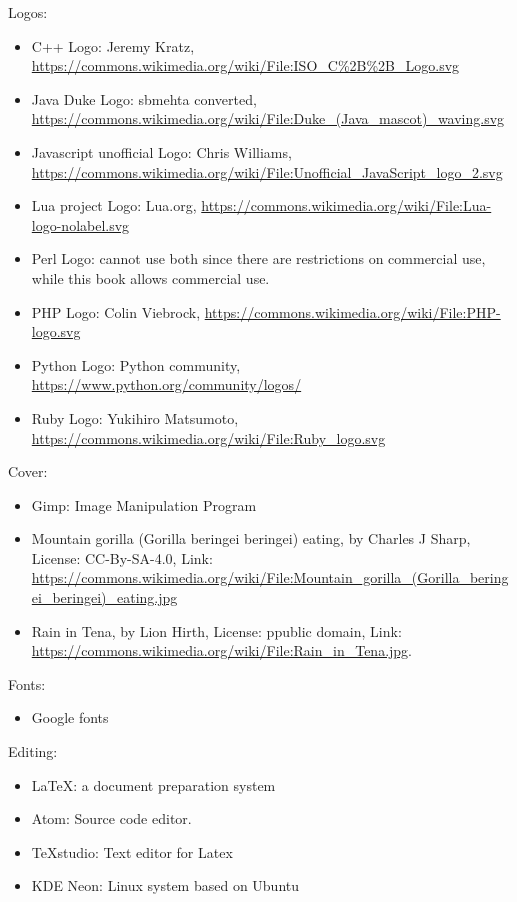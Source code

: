 \documentclass[12pt]{book}
\begin{document}
Logos: 
\begin{itemize}
	\item C++ Logo: Jeremy Kratz, \url{https://commons.wikimedia.org/wiki/File:ISO_C\%2B\%2B_Logo.svg}
	\item Java Duke Logo: sbmehta converted, \url{https://commons.wikimedia.org/wiki/File:Duke_(Java_mascot)_waving.svg}
	\item Javascript unofficial Logo: Chris Williams,  \url{https://commons.wikimedia.org/wiki/File:Unofficial_JavaScript_logo_2.svg}
	\item Lua project Logo: Lua.org, \url{https://commons.wikimedia.org/wiki/File:Lua-logo-nolabel.svg}
	\item Perl Logo: cannot use both since there are restrictions on commercial use, while this book allows commercial use.
	\item PHP Logo: Colin Viebrock, \url{https://commons.wikimedia.org/wiki/File:PHP-logo.svg}
	\item Python Logo: Python community, \url{https://www.python.org/community/logos/}
	\item Ruby Logo: Yukihiro Matsumoto, \url{https://commons.wikimedia.org/wiki/File:Ruby_logo.svg}
\end{itemize}

Cover:
\begin{itemize}
	\item Gimp: Image Manipulation Program
	\item Mountain gorilla (Gorilla beringei beringei) eating, by Charles J Sharp, License: CC-By-SA-4.0, Link: \url{https://commons.wikimedia.org/wiki/File:Mountain_gorilla_(Gorilla_beringei_beringei)_eating.jpg}
	\item Rain in Tena, by Lion Hirth, License: ppublic domain, Link: \url{https://commons.wikimedia.org/wiki/File:Rain_in_Tena.jpg}.
\end{itemize}

Fonts: 
\begin{itemize}
	\item Google fonts 
\end{itemize}

Editing:
\begin{itemize}
	\item \LaTeX: a document preparation system
	\item Atom: Source code editor.
	\item TeXstudio: Text editor for Latex
	\item KDE Neon: Linux system based on Ubuntu
\end{itemize}
\end{document}
